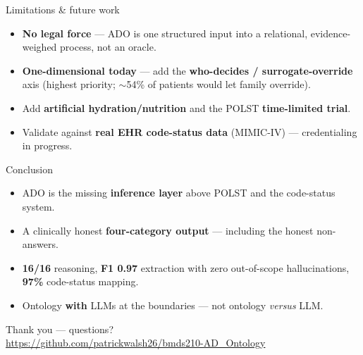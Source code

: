 \documentclass[aspectratio=169,10pt]{beamer}
\newcommand{\hl}[1]{\textcolor{adoblue}{\textbf{#1}}}
\begin{document}
\begin{frame}{Limitations \& future work}
  \begin{itemize}
    \item \textbf{No legal force} --- ADO is one structured input into a relational, evidence-weighed process, not an oracle.
    \item \textbf{One-dimensional today} --- add the \hl{who-decides / surrogate-override} axis (highest priority; $\sim$54\% of patients would let family override).
    \item Add \hl{artificial hydration/nutrition} and the POLST \hl{time-limited trial}.
    \item Validate against \hl{real EHR code-status data} (MIMIC-IV) --- credentialing in progress.
  \end{itemize}
\end{frame}

\begin{frame}{Conclusion}
  \begin{itemize}
    \item ADO is the missing \hl{inference layer} above POLST and the code-status system.
    \item A clinically honest \hl{four-category output} --- including the honest non-answers.
    \item \hl{16/16} reasoning, \hl{F1 0.97} extraction with zero out-of-scope hallucinations, \hl{97\%} code-status mapping.
    \item Ontology \hl{with} LLMs at the boundaries --- not ontology \emph{versus} LLM.
  \end{itemize}
  \vspace{0.8em}
  \begin{center}
    \large Thank you --- questions?\\
    \footnotesize \url{https://github.com/patrickwalsh26/bmds210-AD_Ontology}
  \end{center}
\end{frame}
\end{document}
